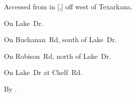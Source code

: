 
\begin{LocationList}

Accessed from  in [,] off  west of Texarkana.

\Location{\GarageHQ \Garage}
On  Lake~Dr.

On  Buchanan~Rd, south of  Lake~Dr.

On Robison~Rd, north of  Lake~Dr.

\Location{\TruckService \Service}
On  Lake~Dr at  Chelf~Rd.

\Location{\TruckStop \Gas \Rest}
By  .

\end{LocationList}


